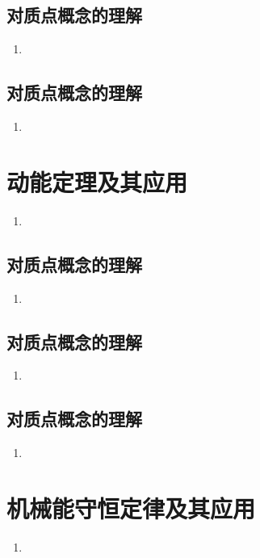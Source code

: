 \documentclass[cn,11pt]{elegantbook}
\begin{document}
\section{对质点概念的理解}
\begin{enumerate}
   \item 
\end{enumerate}

\section{对质点概念的理解}
\begin{enumerate}
   \item 
\end{enumerate}


\chapter{动能定理及其应用}
\begin{enumerate}
   \item 
\end{enumerate}

\section{对质点概念的理解}
\begin{enumerate}
   \item 
\end{enumerate}

\section{对质点概念的理解}
\begin{enumerate}
   \item 
\end{enumerate}

\section{对质点概念的理解}
\begin{enumerate}
   \item 
\end{enumerate}


\chapter{机械能守恒定律及其应用}
\begin{enumerate}
   \item 
\end{enumerate}
\end{document}
